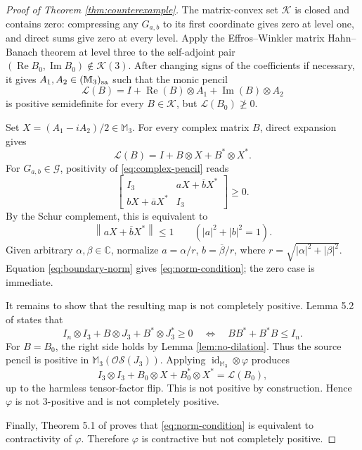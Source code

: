 \documentclass[11pt]{article}
\newcommand{\C}{\mathbb C}
\newcommand{\M}{\mathbb M}
\newcommand{\OS}{\mathcal{OS}}
\newcommand{\K}{\mathcal K}
\newcommand{\G}{\mathcal G}
\newcommand{\Rea}{\operatorname{Re}}
\newcommand{\Ima}{\operatorname{Im}}
\newcommand{\norm}[1]{\left\lVert #1\right\rVert}
\begin{document}
\begin{proof}[Proof of Theorem \ref{thm:counterexample}]
The matrix-convex set \(\K\) is closed and contains zero: compressing any
\(G_{a,b}\) to its first coordinate gives zero at level one, and direct sums
give zero at every level. Apply the
Effros--Winkler matrix Hahn--Banach theorem \cite[Theorem 2.2]{HKM} at
level three to the self-adjoint pair
\((\Rea B_0,\Ima B_0)\notin\K(3)\). After changing signs of the
coefficients if necessary, it gives \(A_1,A_2\in(\M_3)_{\rm sa}\) such that
the monic pencil
\begin{equation}\label{eq:real-pencil}
 \mathcal L(B)=I+\Rea(B)\otimes A_1+\Ima(B)\otimes A_2
\end{equation}
is positive semidefinite for every \(B\in\K\), but
\(\mathcal L(B_0)\not\ge0\).

Set \(X=(A_1-iA_2)/2\in\M_3\). For every complex matrix \(B\), direct
expansion gives
\begin{equation}\label{eq:complex-pencil}
 \mathcal L(B)=I+B\otimes X+B^*\otimes X^*.
\end{equation}
For \(G_{a,b}\in\G\), positivity of \eqref{eq:complex-pencil} reads
\[
 \begin{bmatrix}
 I_3&aX+\overline bX^*\\
 bX+\overline aX^*&I_3
 \end{bmatrix}\ge0.
\]
By the Schur complement, this is equivalent to
\begin{equation}\label{eq:boundary-norm}
 \norm{aX+\overline bX^*}\le1
 \qquad(|a|^2+|b|^2=1).
\end{equation}
Given arbitrary \(\alpha,\beta\in\C\), normalize
\(a=\alpha/r\), \(b=\overline\beta/r\), where
\(r=\sqrt{|\alpha|^2+|\beta|^2}\). Equation
\eqref{eq:boundary-norm} gives \eqref{eq:norm-condition}; the zero case is
immediate.

It remains to show that the resulting map is not completely positive.
Lemma 5.2 of \cite{DDM} states that
\[
 I_n\otimes I_3+B\otimes J_3+B^*\otimes J_3^*\ge0
 \quad\Longleftrightarrow\quad BB^*+B^*B\le I_n.
\]
For \(B=B_0\), the right side holds by Lemma \ref{lem:no-dilation}.
Thus the source pencil is positive in \(\M_3(\OS(J_3))\). Applying
\(\operatorname{id}_{\M_3}\otimes\varphi\) produces
\[
 I_3\otimes I_3+B_0\otimes X+B_0^*\otimes X^*=\mathcal L(B_0),
\]
up to the harmless tensor-factor flip. This is not positive by construction.
Hence \(\varphi\) is not 3-positive and is not completely positive.

Finally, Theorem 5.1 of \cite{DDM} proves that
\eqref{eq:norm-condition} is equivalent to contractivity of \(\varphi\).
Therefore \(\varphi\) is contractive but not completely positive.
\end{proof}
\end{document}
